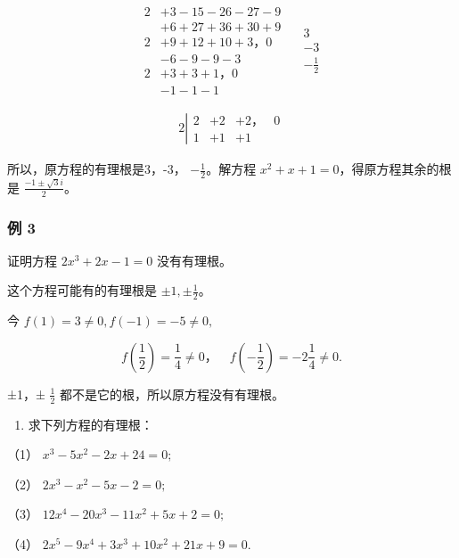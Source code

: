 \[
\begin{array}{rl} {2} & {+ 3 - 15 - 26 - 27 - 9} \\ & {+ 6 + 27 + 36 + 30 + 9} \\ {2} & {+ 9 + 12 + 10 + 3\text{，} 0} \\ & {- 6 - 9 - 9 - 3} \\ {2} & {+ 3 + 3 + 1\text{，} 0} \\ & {- 1 - 1 - 1} \end{array} \quad \begin{array}{l} {3} \\ {- 3} \\ {- \frac {1}{2}} \end{array}
\]

\[
\begin{array}{rl} {2 \left| \begin{array}{llll} 2 & + 2 & + 2\text{，} & 0 \\ 1 & + 1 & + 1 \end{array} \right.} \end{array}
\]

所以，原方程的有理根是3，-3， \(-\frac{1}{2}\)。解方程
\(x^{2}+x+1=0\)，得原方程其余的根是 \(\frac{-1\pm\sqrt{3}i}{2}\)。

\subsubsection{例 3}

证明方程 \(2x^{3} + 2x - 1 = 0\) 没有有理根。

 这个方程可能有的有理根是 \(\pm 1, \pm \frac{1}{2}\)。

今 \(f(1) = 3 \neq 0, f(-1) = -5 \neq 0,\)

\[
f \left(\frac {1}{2}\right) = \frac {1}{4} \neq 0\text{，} \quad f \left(- \frac {1}{2}\right) = - 2 \frac {1}{4} \neq 0.
\]

±1，± \(\frac{1}{2}\) 都不是它的根，所以原方程没有有理根。

\begin{enumerate}
\item
  求下列方程的有理根：
\end{enumerate}

（1） \(x^{3} - 5x^{2} - 2x + 24 = 0;\)

（2） \(2x^{3} - x^{2} - 5x - 2 = 0;\)

（3） \(12x^{4} - 20x^{3} - 11x^{2} + 5x + 2 = 0;\)

（4） \(2x^{5} - 9x^{4} + 3x^{3} + 10x^{2} + 21x + 9 = 0.\)

